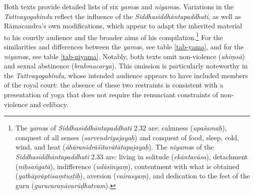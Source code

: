 Both texts provide detailed lists of six \textit{yama}s and \textit{niyama}s. Variations in the \textit{Tattvayogabindu} reflect the influence of the \emph{Siddhasiddhāntapaddhati}, as well as Rāmacandra's own modifications, which appear to adapt the inherited material to his courtly audience and the broader aims of his compilation.\footnote{The \textit{yama}s of \textit{Siddhasiddhāntapaddhati} 2.32 are: calmness (\textit{upaśamaḥ}), conquest of all senses (\textit{sarvendriyajayaḥ}) and conquest of food, sleep, cold, wind, and heat (\textit{āhāranidrāśītavātātapajayaḥ}). The \textit{niyama}s of the \textit{Siddhasiddhāntapaddhati} 2.33 are: living in solitude (\textit{ekāntavāsa}), detachment (\textit{niḥsaṅgatā}), indifference (\textit{udāsīnyaṃ}), contentment with what is obtained (\textit{yathāprāptisaṃtuṣṭiḥ}), aversion (\textit{vairasyaṃ}), and dedication to the feet of the guru (\textit{gurucaraṇāvarūḍhatvam}).} For the similarities and differences between the \textit{yama}s, see table \ref{tab-yama}, and for the \textit{niyama}s, see table \ref{tab-niyama}. Notably, both texts omit non-violence (\emph{ahiṃsā}) and sexual abstinence (\textit{brahmacarya}). This omission is particularly noteworthy in the \textit{Tattvayogabindu}, whose intended audience appears to have included members of the royal court: the absence of these two restraints is consistent with a presentation of yoga that does not require the renunciant constraints of non-violence and celibacy. 

